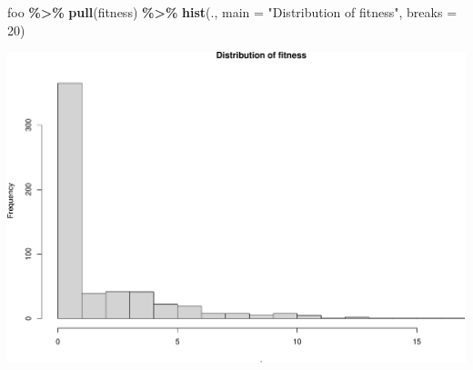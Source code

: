 \documentclass[
  ignorenonframetext,
]{beamer}
\newenvironment{Shaded}{\begin{snugshade}}{\end{snugshade}}
\newcommand{\AttributeTok}[1]{\textcolor[rgb]{0.13,0.29,0.53}{#1}}
\newcommand{\DecValTok}[1]{\textcolor[rgb]{0.00,0.00,0.81}{#1}}
\newcommand{\FunctionTok}[1]{\textcolor[rgb]{0.13,0.29,0.53}{\textbf{#1}}}
\newcommand{\NormalTok}[1]{#1}
\newcommand{\SpecialCharTok}[1]{\textcolor[rgb]{0.81,0.36,0.00}{\textbf{#1}}}
\newcommand{\StringTok}[1]{\textcolor[rgb]{0.31,0.60,0.02}{#1}}
\begin{document}
\begin{frame}[fragile]{}
\protect\hypertarget{section-41}{}
\tiny

\begin{Shaded}
\begin{Highlighting}[]
\NormalTok{foo }\SpecialCharTok{\%\textgreater{}\%} \FunctionTok{pull}\NormalTok{(fitness) }\SpecialCharTok{\%\textgreater{}\%} \FunctionTok{hist}\NormalTok{(., }\AttributeTok{main =} \StringTok{"Distribution of fitness"}\NormalTok{, }\AttributeTok{breaks =} \DecValTok{20}\NormalTok{)}
\end{Highlighting}
\end{Shaded}

\includegraphics{week14p2_files/figure-beamer/unnamed-chunk-38-1.pdf}
\end{frame}
\end{document}
